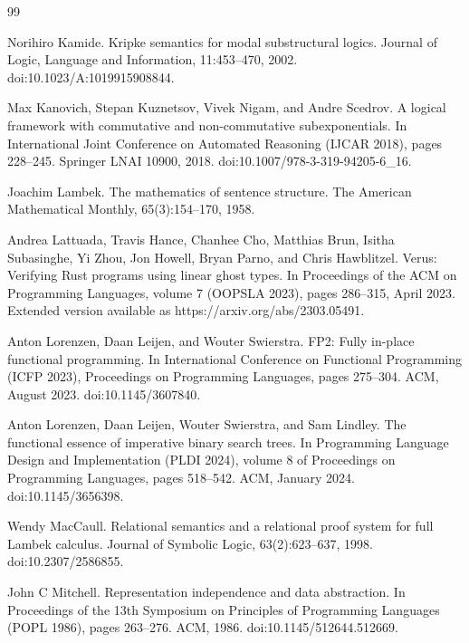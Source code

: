 \documentclass[10pt,a4paper]{amsart}
\begin{document}
\begin{thebibliography}{99}
\par\noindent  [23]  Norihiro Kamide.  Kripke semantics for modal substructural logics.  Journal of Logic, Language and Information, 11:453–470, 2002.  doi:10.1023/A:1019915908844.  
 
\par\noindent  [24]  Max Kanovich, Stepan Kuznetsov, Vivek Nigam, and Andre Scedrov.  A logical framework with commutative and non-commutative subexponentials.  In International Joint Conference on Automated Reasoning (IJCAR 2018), pages 228–245. Springer LNAI 10900, 2018.  doi:10.1007/978-3-319-94205-6\_16.  
 
\par\noindent  [25]  Joachim Lambek.  The mathematics of sentence structure.  The American Mathematical Monthly, 65(3):154–170, 1958.  
 
\par\noindent  [26]  Andrea Lattuada, Travis Hance, Chanhee Cho, Matthias Brun, Isitha Subasinghe, Yi Zhou, Jon Howell, Bryan Parno, and Chris Hawblitzel.  Verus: Verifying Rust programs using linear ghost types.  In Proceedings of the ACM on Programming Languages, volume 7 (OOPSLA 2023), pages 286–315, April 2023.  Extended version available as https://arxiv.org/abs/2303.05491.  
 
\par\noindent  [27]  Anton Lorenzen, Daan Leijen, and Wouter Swierstra.  FP2: Fully in-place functional programming.  In International Conference on Functional Programming (ICFP 2023), Proceedings on Programming Languages, pages 275–304. ACM, August 2023.  doi:10.1145/3607840.  
 
\par\noindent  [28]  Anton Lorenzen, Daan Leijen, Wouter Swierstra, and Sam Lindley.  The functional essence of imperative binary search trees.  In Programming Language Design and Implementation (PLDI 2024), volume 8 of Proceedings on Programming Languages, pages 518–542. ACM, January 2024.  doi:10.1145/3656398.  
 
\par\noindent  [29]  Wendy MacCaull.  Relational semantics and a relational proof system for full Lambek calculus.  Journal of Symbolic Logic, 63(2):623–637, 1998.  doi:10.2307/2586855.  
 
\par\noindent  [30]  John C Mitchell.  Representation independence and data abstraction.  In Proceedings of the 13th Symposium on Principles of Programming Languages (POPL 1986), pages 263–276. ACM, 1986.  doi:10.1145/512644.512669.  
 

\end{thebibliography}
\end{document}
